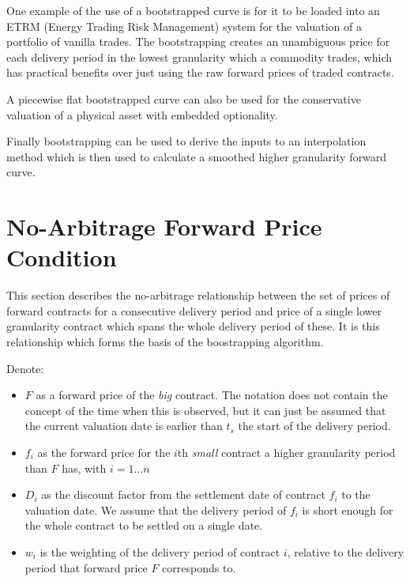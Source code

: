 \documentclass{article}
\begin{document}

\bigskip

One example of the use of a bootstrapped curve is for it to be loaded into an ETRM
(Energy Trading Risk Management) system for the valuation of a portfolio of vanilla
trades. The bootstrapping creates an unambiguous price for each delivery period in the
lowest granularity which a commodity trades, which has practical benefits over just
using the raw forward prices of traded contracts.

A piecewise flat bootstrapped curve can also be used for the conservative valuation
of a physical asset with embedded optionality.


Finally bootstrapping can be used to derive the inputs to an interpolation method which
is then used to calculate a smoothed higher granularity forward curve.

\section{No-Arbitrage Forward Price Condition}
This section describes the no-arbitrage relationship between the set of prices of forward contracts
for a consecutive delivery period and price of a single lower granularity contract which spans 
the whole delivery period of these. It is this relationship which forms the basis of the boostrapping
algorithm.

Denote:
\begin{itemize}
    \item $F$ as a forward price of the \emph{big} contract.
    The notation does not contain the concept of the
    time when this is observed, but it can just be assumed that the current valuation 
    date is earlier than $t_s$ the start of the delivery period.
    \item $f_i$ as the forward price for the $i$th \emph{small} contract a higher granularity 
    period than $F$ has, with $i=1\dots n$
    \item $D_i$ as the discount factor from the settlement date of contract $f_i$ to the 
    valuation date. We assume that the delivery period of $f_i$ is short enough for 
    the whole contract to be settled on a single date.
    \item $w_i$ is the weighting of the delivery period of contract $i$, relative to
    the delivery period that forward price $F$ corresponds to.
\end{itemize}
\end{document}
